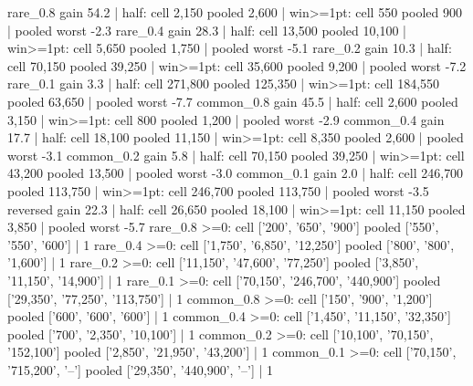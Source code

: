 rare_0.8    gain  54.2 | half: cell 2{,}150 pooled 2{,}600 | win>=1pt: cell 550 pooled 900 | pooled worst -2.3
rare_0.4    gain  28.3 | half: cell 13{,}500 pooled 10{,}100 | win>=1pt: cell 5{,}650 pooled 1{,}750 | pooled worst -5.1
rare_0.2    gain  10.3 | half: cell 70{,}150 pooled 39{,}250 | win>=1pt: cell 35{,}600 pooled 9{,}200 | pooled worst -7.2
rare_0.1    gain   3.3 | half: cell 271{,}800 pooled 125{,}350 | win>=1pt: cell 184{,}550 pooled 63{,}650 | pooled worst -7.7
common_0.8  gain  45.5 | half: cell 2{,}600 pooled 3{,}150 | win>=1pt: cell 800 pooled 1{,}200 | pooled worst -2.9
common_0.4  gain  17.7 | half: cell 18{,}100 pooled 11{,}150 | win>=1pt: cell 8{,}350 pooled 2{,}600 | pooled worst -3.1
common_0.2  gain   5.8 | half: cell 70{,}150 pooled 39{,}250 | win>=1pt: cell 43{,}200 pooled 13{,}500 | pooled worst -3.0
common_0.1  gain   2.0 | half: cell 246{,}700 pooled 113{,}750 | win>=1pt: cell 246{,}700 pooled 113{,}750 | pooled worst -3.5
reversed    gain  22.3 | half: cell 26{,}650 pooled 18{,}100 | win>=1pt: cell 11{,}150 pooled 3{,}850 | pooled worst -5.7
rare_0.8    >=0: cell ['200', '650', '900'] pooled ['550', '550', '600'] | 1%
rare_0.4    >=0: cell ['1{,}750', '6{,}850', '12{,}250'] pooled ['800', '800', '1{,}600'] | 1%
rare_0.2    >=0: cell ['11{,}150', '47{,}600', '77{,}250'] pooled ['3{,}850', '11{,}150', '14{,}900'] | 1%
rare_0.1    >=0: cell ['70{,}150', '246{,}700', '440{,}900'] pooled ['29{,}350', '77{,}250', '113{,}750'] | 1%
common_0.8  >=0: cell ['150', '900', '1{,}200'] pooled ['600', '600', '600'] | 1%
common_0.4  >=0: cell ['1{,}450', '11{,}150', '32{,}350'] pooled ['700', '2{,}350', '10{,}100'] | 1%
common_0.2  >=0: cell ['10{,}100', '70{,}150', '152{,}100'] pooled ['2{,}850', '21{,}950', '43{,}200'] | 1%
common_0.1  >=0: cell ['70{,}150', '715{,}200', '--'] pooled ['29{,}350', '440{,}900', '--'] | 1%
